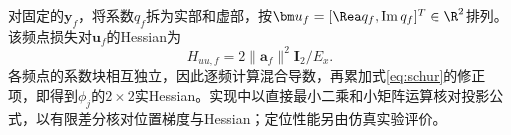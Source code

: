 对固定的$\bm y_f$，将系数$q_f$拆为实部和虚部，按$\bm u_f=[\Rea q_f,\operatorname{Im}q_f]^T\in\R^2$排列。该频点损失对$\bm u_f$的Hessian为
\begin{equation}
 H_{uu,f}=2\|\bm a_f\|^2\bm I_2/E_x .
\end{equation}
各频点的系数块相互独立，因此逐频计算混合导数，再累加式\eqref{eq:schur}的修正项，即得到$\phi_j$的$2\times2$实Hessian。实现中以直接最小二乘和小矩阵运算核对投影公式，以有限差分核对位置梯度与Hessian；定位性能另由仿真实验评价。
